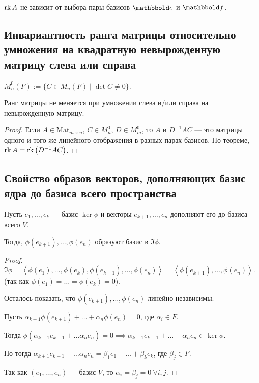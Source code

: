 \begin{comment}
    Число $\dim \Im \phi$ называется \textit{рангом} линейного отображения $\phi$, обозначается $\rk \phi$.
\end{comment}

\begin{corollary}
    $\operatorname{\mathop{\mathrm{rk}}} A$ не зависит от выбора пары базисов $\E$ и $\F$.
\end{corollary}


\subsection{Инвариантность ранга матрицы относительно умножения на квадратную невырожденную матрицу слева или справа}

\begin{designation}
    $M^{0}_n(F) := \{ C \in M_n(F) \mid \det C \neq 0\}$.  
\end{designation}

\begin{corollary}
    Ранг матрицы не меняется при умножении слева и/или справа на невырожденную матрицу.
\end{corollary}

\begin{proof}
    Если $A \in \text{Mat}_{m \times n}$, $C \in M^{0}_n$, $D \in M_m^{0}$, то $A$ и $D^{-1}AC$ --- это матрицы одного и того же линейного отображения в разных парах базисов.
    По теореме, $\operatorname{\mathop{\mathrm{rk}}} A = \operatorname{\mathop{\mathrm{rk}}}\left(D^{-1}AC\right)$.
\end{proof}


\subsection{Свойство образов векторов, дополняющих базис ядра до базиса всего пространства}

\begin{proposal}
    Пусть $e_1, \dots, e_k$ --- базис $\ker \phi$ и векторы $e_{k + 1}, \dots, e_n$ дополняют его до базиса всего $V$.

    Тогда, $\phi(e_{k + 1}), \dots, \phi(e_n)$ образуют базис в $\Im \phi$.
\end{proposal}

\begin{proof}
    $\Im \phi = \left< \phi(e_1), \dots, \phi(e_k), \phi(e_{k + 1}), \dots, \phi(e_n) \right> = \left< \phi(e_{k + 1}), \dots, \phi(e_n) \right>$. (так как $\phi(e_1) = \dots = \phi(e_k) = 0$).

    Осталось показать, что $\phi(e_{k + 1}), \dots, \phi(e_n)$ линейно независимы.

    Пусть $\alpha_{k + 1} \phi(e_{k + 1}) + \dots + \alpha_n \phi(e_n) = 0$, где $\alpha_i \in F$.

    Тогда $\phi(\alpha_{k + 1} e_{k + 1} + \dots \alpha_n e_n) = 0 \implies \alpha_{k + 1} e_{k + 1} + \dots + \alpha_n e_n \in \ker \phi$.

    Но тогда $\alpha_{k + 1} e_{k + 1} + \dots \alpha_n e_n = \beta_1 e_1 + \dots + \beta_k e_k$, где $\beta_j \in F$.

    Так как $(e_1, \dots, e_n)$ --- базис $V$, то $\alpha_i = \beta_j = 0 \ \forall i, j$.
\end{proof}


